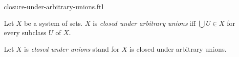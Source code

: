 \documentclass{naproche-library}
\begin{document}
\begin{smodule}[title=Closure Under Arbitrary Unions]{closure-under-arbitrary-unions.ftl}

\begin{definition}[forthel,id=FOUNDATIONS_14_3959378992431104]
  Let $X$ be a system of sets.
  $X$ is \emph{closed under arbitrary unions} iff $\bigcup U \in X$ for every  subclass $U$ of $X$.

  Let $X$ is \emph{closed under unions} stand for $X$ is closed under arbitrary unions.
\end{definition}
\end{smodule}
\end{document}
